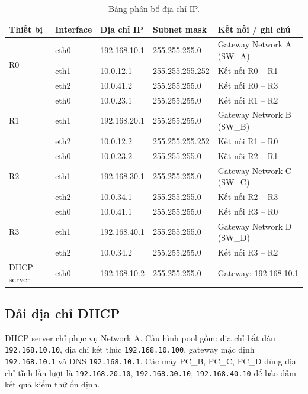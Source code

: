 \documentclass[12pt,a4paper]{article}
\begin{document}
\begin{table}[H]
  \centering
  \caption{Bảng phân bổ địa chỉ IP.}
  \label{tab:ip}
  \small
  \begin{tabularx}{\textwidth}{@{}l l l l X@{}}
    \toprule
    \textbf{Thiết bị} & \textbf{Interface} & \textbf{Địa chỉ IP} & \textbf{Subnet mask} & \textbf{Kết nối / ghi chú} \\
    \midrule
    \multirow{3}{*}{R0}
      & eth0 & 192.168.10.1 & 255.255.255.0   & Gateway Network A (SW\_A) \\
      & eth1 & 10.0.12.1    & 255.255.255.252 & Kết nối R0 -- R1 \\
      & eth2 & 10.0.41.2    & 255.255.255.0   & Kết nối R0 -- R3 \\
    \midrule
    \multirow{3}{*}{R1}
      & eth0 & 10.0.23.1    & 255.255.255.0   & Kết nối R1 -- R2 \\
      & eth1 & 192.168.20.1 & 255.255.255.0   & Gateway Network B (SW\_B) \\
      & eth2 & 10.0.12.2    & 255.255.255.252 & Kết nối R1 -- R0 \\
    \midrule
    \multirow{3}{*}{R2}
      & eth0 & 10.0.23.2    & 255.255.255.0   & Kết nối R2 -- R1 \\
      & eth1 & 192.168.30.1 & 255.255.255.0   & Gateway Network C (SW\_C) \\
      & eth2 & 10.0.34.1    & 255.255.255.0   & Kết nối R2 -- R3 \\
    \midrule
    \multirow{3}{*}{R3}
      & eth0 & 10.0.41.1    & 255.255.255.0   & Kết nối R3 -- R0 \\
      & eth1 & 192.168.40.1 & 255.255.255.0   & Gateway Network D (SW\_D) \\
      & eth2 & 10.0.34.2    & 255.255.255.0   & Kết nối R3 -- R2 \\
    \midrule
    DHCP server & eth0 & 192.168.10.2 & 255.255.255.0 & Gateway: 192.168.10.1 \\
    \bottomrule
  \end{tabularx}
\end{table}

\subsection{Dải địa chỉ DHCP}

DHCP server chỉ phục vụ Network A. Cấu hình pool gồm: địa chỉ bắt đầu
\texttt{192.168.10.10}, địa chỉ kết thúc \texttt{192.168.10.100}, gateway mặc định
\texttt{192.168.10.1} và DNS \texttt{192.168.10.1}. Các máy PC\_B, PC\_C, PC\_D dùng địa chỉ
tĩnh lần lượt là \texttt{192.168.20.10}, \texttt{192.168.30.10}, \texttt{192.168.40.10} để bảo
đảm kết quả kiểm thử ổn định.
\end{document}
